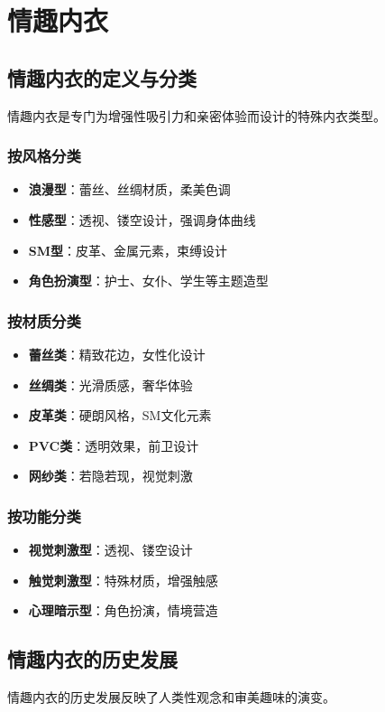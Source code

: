 \documentclass[12pt,UTF8]{ctexbook}
\begin{document}
\chapter{情趣内衣}
\section{情趣内衣的定义与分类}
情趣内衣是专门为增强性吸引力和亲密体验而设计的特殊内衣类型。

\subsection{按风格分类}
\begin{itemize}[leftmargin=2cm]
	\item \textbf{浪漫型}：蕾丝、丝绸材质，柔美色调
	\item \textbf{性感型}：透视、镂空设计，强调身体曲线
	\item \textbf{SM型}：皮革、金属元素，束缚设计
	\item \textbf{角色扮演型}：护士、女仆、学生等主题造型
\end{itemize}

\subsection{按材质分类}
\begin{itemize}[leftmargin=2cm]
	\item \textbf{蕾丝类}：精致花边，女性化设计
	\item \textbf{丝绸类}：光滑质感，奢华体验
	\item \textbf{皮革类}：硬朗风格，SM文化元素
	\item \textbf{PVC类}：透明效果，前卫设计
	\item \textbf{网纱类}：若隐若现，视觉刺激
\end{itemize}

\subsection{按功能分类}
\begin{itemize}[leftmargin=2cm]
	\item \textbf{视觉刺激型}：透视、镂空设计
	\item \textbf{触觉刺激型}：特殊材质，增强触感
	\item \textbf{心理暗示型}：角色扮演，情境营造
\end{itemize}

\section{情趣内衣的历史发展}
情趣内衣的历史发展反映了人类性观念和审美趣味的演变。
\end{document}
